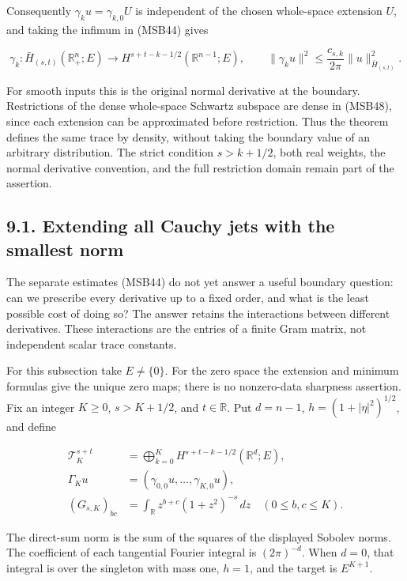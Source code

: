 \documentclass[
  11pt,
]{article}
\makeatletter
\let\ReaderOriginalAnchorStart\hyper@anchorstart
\let\ReaderOriginalAnchorEnd\hyper@anchorend
\let\ReaderPendingAliases\@empty
\def\ReaderArmAliases#1{\gdef\ReaderPendingAliases{#1}}
\def\hyper@anchorstart#1{\ReaderIfNativeAnchorTF{#1}{\ReaderPendingAliases\global\let\ReaderPendingAliases\@empty}{}\ReaderOriginalAnchorStart{#1}}
\makeatother
\begin{document}
Consequently \(\gamma_ku=\gamma_{k,0}U\) is independent of the chosen
whole-space extension \(U\), and taking the infimum in (MSB44) gives

\[
 \gamma_k:\bar H_{(s,t)}(\mathbb R^n_+;E)
        \longrightarrow H^{s+t-k-1/2}(\mathbb R^{n-1};E),
 \qquad
 \|\gamma_ku\|^2\leq\frac{c_{s,k}}{2\pi}
                      \|u\|_{\bar H_{(s,t)}}^2 .
 \tag{MSB49}
\]

For smooth inputs this is the original normal derivative at the
boundary. Restrictions of the dense whole-space Schwartz subspace are
dense in (MSB48), since each extension can be approximated before
restriction. Thus the theorem defines the same trace by density, without
taking the boundary value of an arbitrary distribution. The strict
condition \(s>k+1/2\), both real weights, the normal derivative
convention, and the full restriction domain remain part of the
assertion.

\ReaderArmAliases{\ReaderOriginalAnchorStart{extending-all-cauchy-jets-with-the-smallest-norm}\ReaderOriginalAnchorEnd}
\subsection{9.1. Extending all Cauchy jets with the smallest
norm}\label{extending-all-cauchy-jets-with-the-smallest-norm}

The separate estimates (MSB44) do not yet answer a useful boundary
question: can we prescribe every derivative up to a fixed order, and
what is the least possible cost of doing so? The answer retains the
interactions between different derivatives. These interactions are the
entries of a finite Gram matrix, not independent scalar trace constants.

For this subsection take \(E\ne\{0\}\). For the zero space the extension
and minimum formulas give the unique zero maps; there is no nonzero-data
sharpness assertion. Fix an integer \(K\geq0\), \(s>K+1/2\), and
\(t\in\mathbb R\). Put \(d=n-1\), \(h=(1+|\eta|^2)^{1/2}\), and define

\[
 \begin{aligned}
 \mathcal T_K^{s+t}
 &=\bigoplus_{k=0}^K H^{s+t-k-1/2}(\mathbb R^d;E),\\
 \Gamma_Ku&=(\gamma_{0,0}u,\ldots,\gamma_{K,0}u),\\
 (G_{s,K})_{bc}
 &=\int_{\mathbb R}z^{b+c}(1+z^2)^{-s}\,dz
       \quad(0\leq b,c\leq K).
 \end{aligned}
 \tag{JT1}
\]

The direct-sum norm is the sum of the squares of the displayed Sobolev
norms. The coefficient of each tangential Fourier integral is
\((2\pi)^{-d}\). When \(d=0\), that integral is over the singleton with
mass one, \(h=1\), and the target is \(E^{K+1}\).
\end{document}

